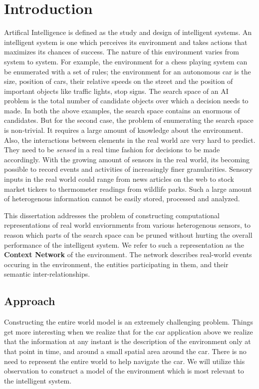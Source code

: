 \chapter{Introduction}

Artifical Intelligence is defined as the study and design of intelligent systems. An intelligent system is one which perceives its environment and takes actions that maximizes its chances of success. The nature of this environment varies from system to system. For example, the environment for a chess playing system can be enumerated with a set of rules; the environment for an autonomous car is the size, position of cars, their relative speeds on the street and the position of important objects like traffic lights, stop signs. The search space of an AI problem is the total number of candidate objects over which a decision needs to made. In both the above examples, the search space contains an enormous of candidates. But for the second case, the problem of enumerating the search space is non-trivial. It requires a large amount of knowledge about the environment. Also, the interactions between elements in the real world are very hard to predict. They need to be \textit{sensed} in a real time fashion for decisions to be made accordingly. With the growing amount of sensors in the real world, its becoming possible to record events and activities of increasingly finer granularities. Sensory inputs in the real world could range from news articles on the web to stock market tickers to thermometer readings from wildlife parks. Such a large amount of heterogenous information cannot be easily stored, processed and analyzed. 

This dissertation addresses the problem of constructing computational representations of real world enviornments from various heterogenous sensors, to reason which parts of the search space can be pruned without hurting the overall performance of the intelligent system. We refer to such a representation as the \textbf{Context Network} of the environment. The network describes real-world events occuring in the environment, the entities participating in them, and their semantic inter-relationships.

\section{Approach}
Constructing the entire world model is an extremely challenging problem. Things get more interesting when we realize that for the car application above we realize that the information at any instant is the description of the environment only at that point in time, and around a small spatial area around the car. There is no need to represent the entire world to help navigate the car. We will utilize this observation to construct a model of the environment which is most relevant to the intelligent system.

